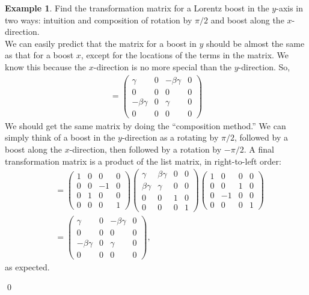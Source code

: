 \documentclass{book}
\theoremstyle{definition}
\newtheorem{exmp}{Example}[section]
\begin{document}
\begin{exmp}
	 Find the transformation matrix for a Lorentz boost in the $y$-axis in two ways: intuition and composition of rotation by $\pi/2$ and boost along the $x$-direction.\\
	 
	 We can easily predict that the matrix for a boost in $y$ should be almost the same as that for a boost $x$, except for the locations of the terms in the matrix. We know this because the $x$-direction is no more special than the $y$-direction. So,
	 \begin{align*}
	 [\Lambda^{\mu'}_\nu] = 
	 \begin{pmatrix}
	 \gamma&0&-\beta\gamma&0\\
	 0&0&0&0\\
	 -\beta\gamma&0&\gamma&0\\
	 0&0&0&0
	 \end{pmatrix}
	 \end{align*}
	 We should get the same matrix by doing the ``composition method.'' We can simply think of a boost in the $y$-direction as a rotating by $\pi/2$, followed by a boost along the $x$-direction, then followed by a rotation by $-\pi/2$. A final transformation matrix is a product of the list matrix, in right-to-left order:
	 \begin{align*}
	 [\Lambda^{\mu'}_\nu] &= 
	 \begin{pmatrix}
	 1 & 0 & 0 & 0 \\
	 0 & 0 & -1 & 0\\
	 0 & 1 & 0 & 0\\
	 0 & 0 & 0 & 1
	 \end{pmatrix}
	 \begin{pmatrix}
	 \gamma & \beta\gamma & 0 & 0\\
	 \beta\gamma & \gamma & 0 & 0\\
	 0 & 0 & 1 & 0\\
	 0 & 0 & 0 & 1
	 \end{pmatrix}
	\begin{pmatrix}
	1 & 0 & 0 & 0\\
	0 & 0 & 1 & 0\\
	0 & -1 & 0 & 0\\
	0 & 0 & 0 & 1
	\end{pmatrix}\\
	&=
	\begin{pmatrix}
	\gamma&0&-\beta\gamma&0\\
	0&0&0&0\\
	-\beta\gamma&0&\gamma&0\\
	0&0&0&0
	\end{pmatrix},
	 \end{align*}
	 as expected.
\end{exmp}\qed
\end{document}
